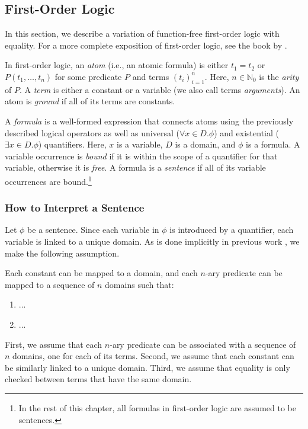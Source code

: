 \subsection{First-Order Logic}

In this section, we describe a variation of function-free first-order logic with
equality. For a more complete exposition of first-order logic, see the book by
\citet{DBLP:books/daglib/0023546}.

In first-order logic, an \emph{atom} (i.e., an atomic formula) is either
$t_1 = t_2$ or $P(t_1, \dots, t_n)$ for some predicate $P$ and terms
$(t_i)_{i=1}^n$. Here, $n \in \mathbb{N}_0$ is the \emph{arity} of $P$. A
\emph{term} is either a constant or a variable (we also call terms
\emph{arguments}). An atom is \emph{ground} if all of its terms are constants.

A \emph{formula} is a well-formed expression that connects atoms using the
previously described logical operators as well as universal
($\forall x \in D. \phi$) and existential ($\exists x \in D. \phi$) quantifiers.
Here, $x$ is a variable, $D$ is a domain, and $\phi$ is a formula. A variable
occurrence is \emph{bound} if it is within the scope of a quantifier for that
variable, otherwise it is \emph{free}. A formula is a \emph{sentence} if all of
its variable occurrences are bound.\footnote{In the rest of this chapter, all
  formulas in first-order logic are assumed to be sentences.}

\subsubsection{How to Interpret a Sentence}

Let $\phi$ be a sentence. Since each variable in $\phi$ is introduced by a
quantifier, each variable is linked to a unique domain. As is done implicitly in
previous work \citep{DBLP:phd/basesearch/VandenBroeck13}, we make the following
assumption.

\begin{assumption}
  Each constant can be mapped to a domain, and each $n$-ary predicate can be
  mapped to a sequence of $n$ domains such that:
  \begin{enumerate}
    \item ...
    \item ...
  \end{enumerate}
\end{assumption}

First, we assume that each $n$-ary predicate can be associated with a sequence
of $n$ domains, one for each of its terms. Second, we assume that each constant
can be similarly linked to a unique domain. Third, we assume that equality is
only checked between terms that have the same domain.

